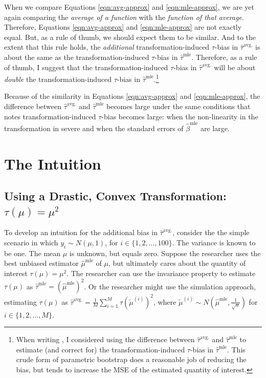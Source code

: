 \documentclass[10pt]{article}
\begin{document}
When we compare Equations \ref{eqn:avg-approx} and \ref{eqn:mle-approx}, we are yet again comparing the \textit{average of a function} with the \textit{function of that average}. 
Therefore, Equations \ref{eqn:avg-approx} and \ref{eqn:mle-approx} are not exactly equal. 
But, as a rule of thumb, we should expect them to be similar. And to the extent that this rule holds, the \emph{additional} transformation-induced $\tau$-bias in $\hat{\tau}^\text{avg.}$ is about the same as the transformation-induced $\tau$-bias in $\hat{\tau}^\text{mle}$. 
Therefore, as a rule of thumb, I suggest that the transformation-induced $\tau$-bias in $\hat{\tau}^\text{avg.}$ will be about \emph{double} the transformation-induced $\tau$-bias in $\hat{\tau}^\text{mle}$.\footnote{When writing \cite{Rainey2017}, I considered using the difference between $\hat{\tau}^\text{avg.}$ and $\hat{\tau}^\text{mle}$ to estimate (and correct for) the transformation-induced $\tau$-bias in $\hat{\tau}^\text{mle}$. This crude form of parametric bootstrap does a reasonable job of reducing the bias, but tends to increase the MSE of the estimated quantity of interest.}

Because of the similarity in Equations \ref{eqn:avg-approx} and \ref{eqn:mle-approx}, the difference between $\hat{\tau}^\text{avg.}$ and $\hat{\tau}^\text{mle}$ becomes large under the same conditions that \cite{Rainey2017} notes transformation-induced $\tau$-bias becomes large: when the non-linearity in the transformation in severe and when the standard errors of $\hat{\beta}^\text{mle}$ are large.

\section*{The Intuition}

\subsection*{Using a Drastic, Convex Transformation: $\tau(\mu) = \mu^2$}

To develop an intuition for the additional bias in $\hat{\tau}^\text{avg.}$, consider the the simple scenario in which $y_i \sim N(\mu, 1)$, for $i \in \{1, 2, ... , 100\}$. 
The variance is known to be one. 
The mean $\mu$ is unknown, but equals zero. 
Suppose the researcher uses the best unbiased estimator $\hat{\mu}^\text{mle}$ of $\mu$, but ultimately cares about the quantity of interest $\tau(\mu) = \mu^2$. 
The researcher can use the invariance property to estimate $\tau(\mu)$ as $\hat{\tau}^\text{mle} = \left( \hat{\mu}^\text{mle} \right) ^2$. 
Or the researcher might use the simulation approach, estimating $\tau(\mu)$ as $\hat{\tau}^\text{avg.} = \frac{1}{M} \sum_{i = 1}^M \tau \left( \tilde{\mu}^{(i)} \right)^2$, where $\tilde{\mu}^{(i)} \sim N \left( \hat{\mu}^\text{mle}, \frac{1}{\sqrt{n}} \right)$ for $i \in \{1, 2, ... , M\}$.
\end{document}
